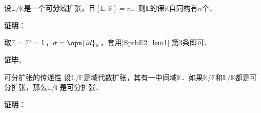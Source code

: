 











\begin{corollary}{}\label{SprbE2_cor2}
设$\mathbb{L}/\mathbb{K}$是一个\textbf{可分}域扩张，且$[\mathbb{L}:\mathbb{K}]=n$．则$\mathbb{L}$的保$\mathbb{K}$自同构有$n$个．
\end{corollary}

\textbf{证明}：

取$\mathbb{F}=\mathbb{F}'=\mathbb{L}$，$\sigma=\opn{id}_{\mathbb{K}}$，套用\autoref{SprbE2_lem1} 第$3$条即可．

\textbf{证毕}．



\begin{corollary}{可分扩张的传递性}\label{SprbE2_cor1}
设$\mathbb{L}/\mathbb{F}$是域代数扩张，其有一中间域$\mathbb{K}$．如果$\mathbb{K}/\mathbb{F}$和$\mathbb{L}/\mathbb{K}$都是可分扩张，那么$\mathbb{L}/\mathbb{F}$是可分扩张．
\end{corollary}

\textbf{证明}：





